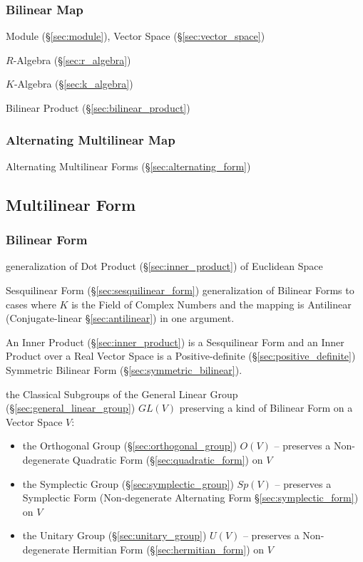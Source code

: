 \subsubsection{Bilinear Map}\label{sec:bilinear_map}

Module (\S\ref{sec:module}), Vector Space (\S\ref{sec:vector_space})

$R$-Algebra (\S\ref{sec:r_algebra})

$K$-Algebra (\S\ref{sec:k_algebra})

Bilinear Product (\S\ref{sec:bilinear_product})



\subsubsection{Alternating Multilinear Map}\label{sec:alternating_map}

Alternating Multilinear Forms (\S\ref{sec:alternating_form})



\subsection{Multilinear Form}\label{sec:multilinear_form}

\subsubsection{Bilinear Form}\label{sec:bilinear_form}

generalization of Dot Product (\S\ref{sec:inner_product}) of Euclidean Space

Sesquilinear Form (\S\ref{sec:sesquilinear_form}) generalization of Bilinear
Forms to cases where $K$ is the Field of Complex Numbers and the mapping is
Antilinear (Conjugate-linear \S\ref{sec:antilinear}) in one argument.

An Inner Product (\S\ref{sec:inner_product}) is a Sesquilinear Form and an
Inner Product over a Real Vector Space is a Positive-definite
(\S\ref{sec:positive_definite}) Symmetric Bilinear Form
(\S\ref{sec:symmetric_bilinear}).

the Classical Subgroups of the General Linear Group
(\S\ref{sec:general_linear_group}) $GL(V)$ preserving a kind of Bilinear Form
on a Vector Space $V$:
\begin{itemize}
  \item the Orthogonal Group (\S\ref{sec:orthogonal_group}) $O(V)$ -- preserves
    a Non-degenerate Quadratic Form (\S\ref{sec:quadratic_form}) on $V$
  \item the Symplectic Group (\S\ref{sec:symplectic_group}) $Sp(V)$
    -- preserves a Symplectic Form (Non-degenerate Alternating Form
    \S\ref{sec:symplectic_form}) on $V$
  \item the Unitary Group (\S\ref{sec:unitary_group}) $U(V)$
    -- preserves a Non-degenerate Hermitian Form (\S\ref{sec:hermitian_form})
    on $V$
\end{itemize}

